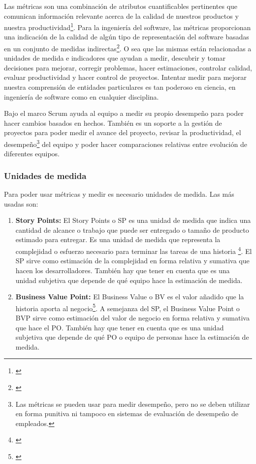 Las métricas son una combinación de atributos cuantificables pertinentes que comunican información relevante acerca de la calidad de nuestros productos y nuestra productividad\footnote{\cite{INCOSE-2005}}. Para la ingeniería del software, las métricas proporcionan una indicación de la calidad de algún tipo de representación del software basadas en un conjunto de medidas indirectas\footnote{\cite{Roger-Pressman-2002}}. O sea que las mismas están relacionadas a unidades de medida e indicadores que ayudan a medir, descubrir y tomar decisiones para mejorar, corregir problemas, hacer estimaciones, controlar calidad, evaluar productividad y hacer control de proyectos. Intentar medir para mejorar nuestra comprensión de entidades particulares es tan poderoso en ciencia, en ingeniería de software como en cualquier disciplina.

Bajo el marco Scrum ayuda al equipo a medir su propio desempeño para poder hacer cambios basados en hechos. También es un soporte a la gestión de proyectos para poder medir el avance del proyecto, revisar la productividad, el desempeño\footnote{Las métricas se pueden usar para medir desempeño, pero no se deben utilizar en forma punitiva ni tampoco en sistemas de evaluación de desempeño de empleados.} del equipo y poder hacer comparaciones relativas entre evolución de diferentes equipos. 

\subsubsection{Unidades de medida}

Para poder usar métricas y medir es necesario unidades de medida. Las más usadas son:

\begin{enumerate}

\item {\textbf{Story Points:}
El Story Points o SP es una unidad de medida que indica una cantidad de alcance o trabajo que puede ser entregado o tamaño de producto estimado para entregar. Es una unidad de medida que representa la complejidad o esfuerzo necesario para terminar las tareas de una historia \footnote{\cite{Jipson-Thomas-2015}}. El SP sirve como estimación de la complejidad en forma relativa y sumativa que hacen los desarrolladores. También hay que tener en cuenta que es una unidad subjetiva que depende de qué equipo hace la estimación de medida.
}

\item {\textbf{Business Value Point:}
El Business Value o BV es el valor añadido que la historia aporta al negocio\footnote{\cite{Pointet-Botton-2012}}. A semejanza del SP, el Business Value Point o BVP sirve como estimación del valor de negocio en forma relativa y sumativa que hace el PO. También hay que tener en cuenta que es una unidad subjetiva que depende de qué PO o equipo de personas hace la estimación de medida.
}

\end{enumerate}

